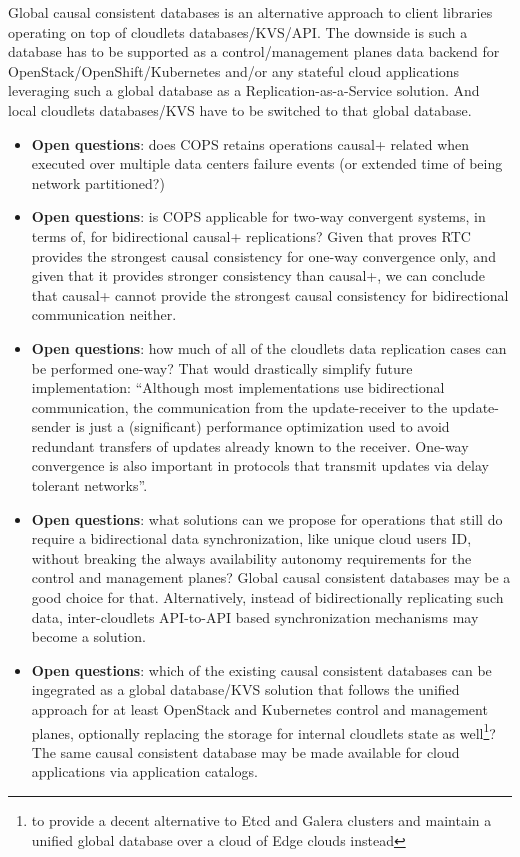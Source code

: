 \documentclass[conference]{IEEEtran}
\begin{document}
Global causal consistent databases\cite{b6} is an alternative approach to
client libraries operating on top of cloudlets databases/KVS/API. The downside
is such a database has to be supported as a control/management planes data
backend for OpenStack/OpenShift/Kubernetes and/or any stateful cloud
applications leveraging such a global database as a Replication-as-a-Service
solution. And local cloudlets databases/KVS have to be switched to that global
database.

\begin{itemize}
  \item \textbf{Open questions}: does COPS retains operations causal+ related
    when executed over multiple data centers failure events (or extended time
    of being network partitioned?)

  \item \textbf{Open questions}: is COPS applicable for two-way convergent
    systems, in terms of\cite{b2}, for bidirectional causal+ replications?
    Given that\cite{b1} proves RTC provides the strongest causal consistency
    for one-way convergence only, and given that it provides stronger
    consistency than causal+, we can conclude that causal+ cannot provide the
    strongest causal consistency for bidirectional communication neither.

  \item \textbf{Open questions}: how much of all of the cloudlets data
    replication cases can be performed one-way? That would drastically simplify
    future implementation: ``Although most implementations use bidirectional
    communication, the communication from the update-receiver to the
    update-sender is just a (significant) performance optimization used to
    avoid redundant transfers of updates already known to the receiver. One-way
    convergence is also important in protocols that transmit updates via delay
    tolerant networks''\cite{b2}.

  \item \textbf{Open questions}: what solutions can we propose for operations
    that still do require a bidirectional data synchronization, like unique
    cloud users ID, without breaking the always availability autonomy
    requirements for the control and management planes? Global causal
    consistent databases may be a good choice for that. Alternatively, instead
    of bidirectionally replicating such data, inter-cloudlets API-to-API based
    synchronization mechanisms may become a solution.

  \item \textbf{Open questions}: which of the existing causal consistent
    databases\cite{b6} can be ingegrated as a global database/KVS solution that
    follows the unified approach for at least OpenStack and Kubernetes control
    and management planes, optionally replacing the storage for internal cloudlets
    state as well\footnote{to provide a decent alternative to Etcd and Galera clusters
    and maintain a unified global database over a cloud of Edge clouds
    instead}? The same causal consistent database may be made available for
    cloud applications via application catalogs.


\end{itemize}
\end{document}
